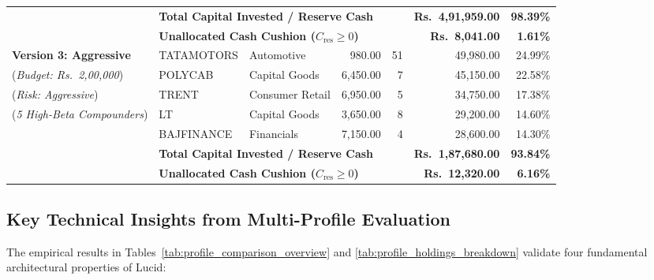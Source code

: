 \begin{table}[H]
{\begin{tabular}{lllrrrr}
\cmidrule{2-7}
& \multicolumn{3}{l}{\textbf{Total Capital Invested / Reserve Cash}} & & \textbf{Rs.~4,91,959.00} & \textbf{98.39\%} \\
& \multicolumn{3}{l}{\textbf{Unallocated Cash Cushion ($C_{\text{res}} \ge 0$)}} & & \textbf{Rs.~8,041.00} & \textbf{1.61\%} \\
\midrule
\textbf{Version 3: Aggressive} & TATAMOTORS & Automotive & 980.00 & 51 & 49,980.00 & 24.99\% \\
(\textit{Budget: Rs.~2,00,000}) & POLYCAB & Capital Goods & 6,450.00 & 7 & 45,150.00 & 22.58\% \\
(\textit{Risk: Aggressive}) & TRENT & Consumer Retail & 6,950.00 & 5 & 34,750.00 & 17.38\% \\
(\textit{5 High-Beta Compounders})& LT & Capital Goods & 3,650.00 & 8 & 29,200.00 & 14.60\% \\
& BAJFINANCE & Financials & 7,150.00 & 4 & 28,600.00 & 14.30\% \\
\cmidrule{2-7}
& \multicolumn{3}{l}{\textbf{Total Capital Invested / Reserve Cash}} & & \textbf{Rs.~1,87,680.00} & \textbf{93.84\%} \\
& \multicolumn{3}{l}{\textbf{Unallocated Cash Cushion ($C_{\text{res}} \ge 0$)}} & & \textbf{Rs.~12,320.00} & \textbf{6.16\%} \\
\bottomrule
\end{tabular}%
}
\end{table}

\subsection{Key Technical Insights from Multi-Profile Evaluation}
The empirical results in Tables~\ref{tab:profile_comparison_overview} and \ref{tab:profile_holdings_breakdown} validate four fundamental architectural properties of Lucid:

